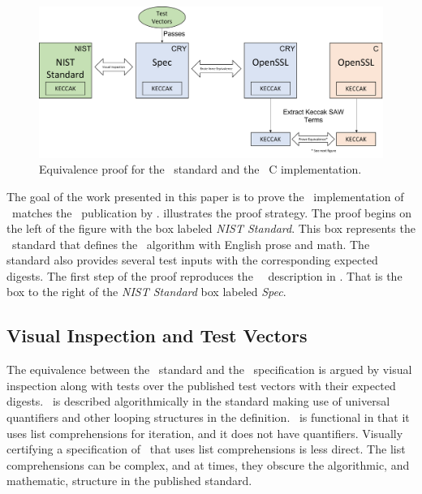 \begin{figure}[t]
  \centering
  \includegraphics[width=\linewidth]{figs/proof.png}
  
  \caption{Equivalence proof for the \shaThree\ standard and the \openssl\ C implementation.}
  \label{fig:proofStructure}
  
\end{figure}

The goal of the work presented in this paper is to prove the \openssl\ implementation of \shaThree\ matches the \fips\ publication by \nist.
 illustrates the proof strategy.
The proof begins on the left of the figure with the box labeled \emph{NIST Standard}. 
This box represents the \fips\ standard that defines the \shaThree\ algorithm with English prose and math.
The standard also provides several test inputs with the corresponding expected digests.
The first step of the proof reproduces the \fips\ \shaThree\ description in \cryptol.
That is the box to the right of the \emph{NIST Standard} box labeled \emph{Spec}.

\subsection{Visual Inspection and Test Vectors}

The equivalence between the \fips\ standard and the \cryptol\ specification is argued by visual inspection along with tests over the published test vectors with their expected digests.
\shaThree\ is described algorithmically in the standard making use of universal quantifiers and other looping structures in the definition.
\cryptol\ is functional in that it uses list comprehensions for iteration, and it does not have quantifiers.
Visually certifying a specification of \shaThree\ that uses list comprehensions is less direct.
The list comprehensions can be complex, and at times, they obscure the algorithmic, and mathematic, structure in the published standard.


